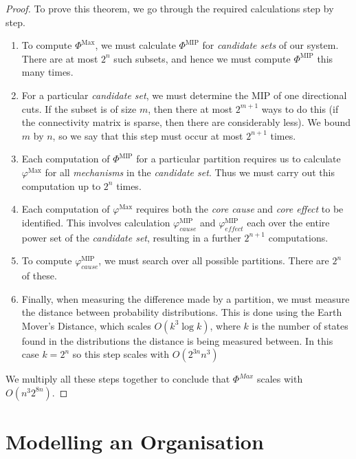\begin{proof}
To prove this theorem, we go through the required calculations step by step.

\begin{enumerate}
	
	\item To compute $\Phi^{\text{Max}}$, we must calculate $\Phi^{\text{MIP}}$ for \textit{candidate sets} of our system. There are at most $2^n$ such subsets, and hence we must compute $\Phi^{\text{MIP}}$ this many times.
	\item For a particular \textit{candidate set}, we must determine the MIP of one directional cuts. If the subset is of size $m$, then there at most $2^{m+1}$ ways to do this (if the connectivity matrix is sparse, then there are considerably less). We bound $m$  by $n$, so we say that this step must occur at most $2^{n+1}$ times.
	\item Each computation of $\Phi^{\text{MIP}}$ for a particular partition requires us to calculate  $\varphi^{\text{Max}}$ for all \textit{mechanisms} in the \textit{candidate set}. Thus we must carry out this computation up to $2^n$ times.
	\item Each computation of $\varphi^{\text{Max}}$ requires both the \textit{core cause} and \textit{core effect} to be identified. This involves calculation $\varphi^{\text{MIP}}_{cause}$ and $\varphi^{\text{MIP}}_{effect}$ each over the entire power set of the \textit{candidate set}, resulting in a further $2^{n+1}$ computations.  
	\item To compute $\varphi_{cause}^{\text{MIP}}$, we must search over all possible partitions. There are $2^n$ of these.
	\item Finally, when measuring the difference made by a partition, we must measure the distance between probability distributions. This is done using the Earth Mover's Distance, which scales $O(k^3 \log k)$, where $k$ is the number of states found in the distributions the distance is being measured between. In this case $k = 2^n$ so this step scales with $O(2^{3n} n^3)$
\end{enumerate}

We multiply all these steps together to conclude that  $\Phi^{Max}$ scales with $O(n^3 2^{8n})$.

\end{proof}
\section{Modelling an Organisation}

